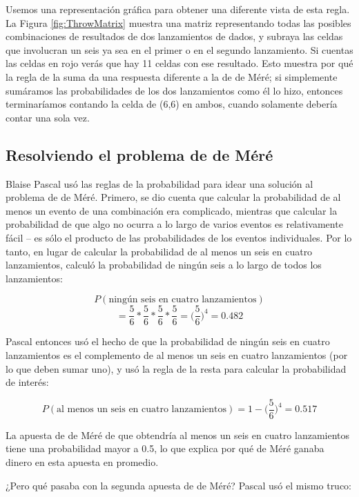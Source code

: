 \documentclass[
  12pt,
]{book}
\begin{document}
Usemos una representación gráfica para obtener una diferente vista de esta regla. La Figura \ref{fig:ThrowMatrix} muestra una matriz representando todas las posibles combinaciones de resultados de dos lanzamientos de dados, y subraya las celdas que involucran un seis ya sea en el primer o en el segundo lanzamiento. Si cuentas las celdas en rojo verás que hay 11 celdas con ese resultado. Esto muestra por qué la regla de la suma da una respuesta diferente a la de de Méré; si simplemente sumáramos las probabilidades de los dos lanzamientos como él lo hizo, entonces terminaríamos contando la celda de (6,6) en ambos, cuando solamente debería contar una sola vez.

\hypertarget{resolviendo-el-problema-de-de-muxe9ruxe9}{%
\subsection{Resolviendo el problema de de Méré}\label{resolviendo-el-problema-de-de-muxe9ruxe9}}

Blaise Pascal usó las reglas de la probabilidad para idear una solución al problema de de Méré. Primero, se dio cuenta que calcular la probabilidad de al menos un evento de una combinación era complicado, mientras que calcular la probabilidad de que algo no ocurra a lo largo de varios eventos es relativamente fácil -- es sólo el producto de las probabilidades de los eventos individuales. Por lo tanto, en lugar de calcular la probabilidad de al menos un seis en cuatro lanzamientos, calculó la probabilidad de ningún seis a lo largo de todos los lanzamientos:

\[
P(\text{ningún seis en cuatro lanzamientos})
\]
\[
= \frac{5}{6}*\frac{5}{6}*\frac{5}{6}*\frac{5}{6}=\bigg(\frac{5}{6}\bigg)^4=0.482
\]

Pascal entonces usó el hecho de que la probabilidad de ningún seis en cuatro lanzamientos es el complemento de al menos un seis en cuatro lanzamientos (por lo que deben sumar uno), y usó la regla de la resta para calcular la probabilidad de interés:

\[
P(\text{al menos un seis en cuatro lanzamientos}) = 1 - \bigg(\frac{5}{6}\bigg)^4=0.517
\]

La apuesta de de Méré de que obtendría al menos un seis en cuatro lanzamientos tiene una probabilidad mayor a 0.5, lo que explica por qué de Méré ganaba dinero en esta apuesta en promedio.

¿Pero qué pasaba con la segunda apuesta de de Méré? Pascal usó el mismo truco:
\end{document}

